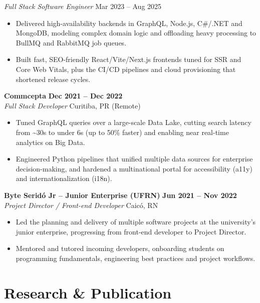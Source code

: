 \documentclass[11pt,a4paper]{article}
\newcommand{\subrole}[2]{%
  \needspace{4\baselineskip}%
  \textit{#1} \hfill \textcolor{muted}{#2}\\[3pt]
}
\newcommand{\role}[4]{%
  \needspace{5\baselineskip}%
  \textbf{#1} \hfill \textbf{#3} \\[2pt]
  \textit{#2} \hfill \textcolor{muted}{#4}\\[4pt]
}
\begin{document}
\subrole{Full Stack Software Engineer}{Mar 2023 -- Aug 2025}
\begin{itemize}[leftmargin=14pt, itemsep=2pt, topsep=0pt]
    \item Delivered high-availability backends in GraphQL, Node.js, C\#/.NET and MongoDB, modeling complex domain logic and offloading heavy processing to BullMQ and RabbitMQ job queues.
    \item Built fast, SEO-friendly React/Vite/Next.js frontends tuned for SSR and Core Web Vitals, plus the CI/CD pipelines and cloud provisioning that shortened release cycles.
\end{itemize}
\vspace{3pt}

\role{Commcepta}{Full Stack Developer}{Dec 2021 -- Dec 2022}{Curitiba, PR (Remote)}
\begin{itemize}[leftmargin=14pt, itemsep=2pt, topsep=0pt]
    \item Tuned GraphQL queries over a large-scale Data Lake, cutting search latency from \textasciitilde30s to under 6s (up to 50\% faster) and enabling near real-time analytics on Big Data.
    \item Engineered Python pipelines that unified multiple data sources for enterprise decision-making, and hardened a multinational portal for accessibility (a11y) and internationalization (i18n).
\end{itemize}
\vspace{3pt}

\role{Byte Serid\'o Jr -- Junior Enterprise (UFRN)}{Project Director / Front-end Developer}{Jun 2021 -- Nov 2022}{Caic\'o, RN}
\begin{itemize}[leftmargin=14pt, itemsep=2pt, topsep=0pt]
    \item Led the planning and delivery of multiple software projects at the university's junior enterprise, progressing from front-end developer to Project Director.
    \item Mentored and tutored incoming developers, onboarding students on programming fundamentals, engineering best practices and project workflows.
\end{itemize}

\section{Research \& Publication}
\end{document}

